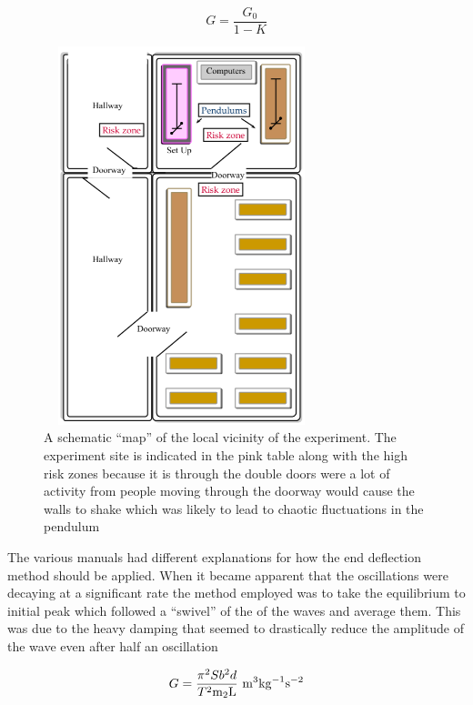 \documentclass[12pt]{article}
\begin{document}
\begin{equation}
\label{eq:coG}
G=\frac{G_{0}}{1-K}
\end{equation}


%
%


\begin{figure}[H]
\centering
\includegraphics[width=8cm, height=11cm]{images/map.png}
\caption{A schematic \enquote{map} of the local vicinity of the experiment. The experiment site is indicated in the pink table along with the high risk zones because it is through the double doors were a lot of activity from people moving through the doorway would cause the walls to shake which was likely to lead to chaotic fluctuations in the pendulum}
\label{fig:map}
\end{figure}

The various manuals had different explanations for how the end deflection method should be applied. When it became apparent that the oscillations were decaying at a significant rate the method employed was to take the equilibrium to initial peak which followed a \enquote{swivel} of the of the waves and average them. This was due to the heavy damping that seemed to drastically reduce the amplitude of the wave even after half an oscillation

\begin{equation}
\label{eq:G}
G=\frac{\pi^2 S  b^2 d}{T^2 \mathrm{m_{2}L}} {\rm \ m}^3 {\rm kg}^{-1} {\rm s}^{-2}
\end{equation}
\end{document}
